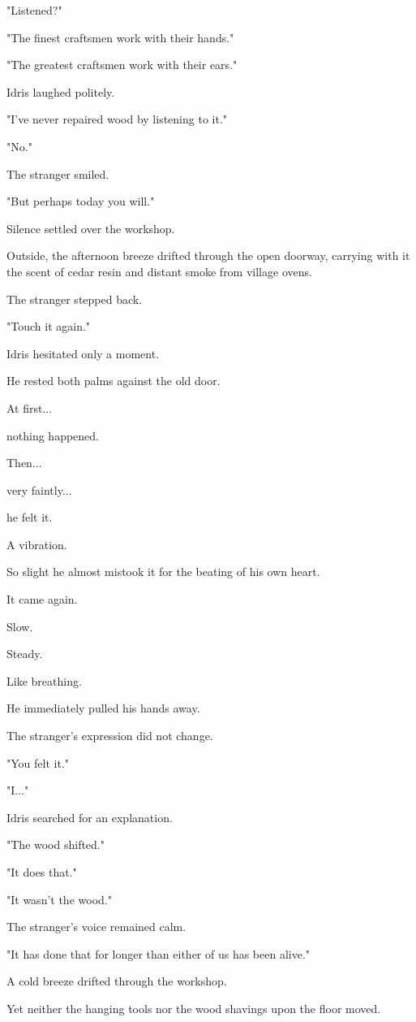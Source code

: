 \documentclass[12pt,openany]{book}
\begin{document}
"Listened?"

"The finest craftsmen work with their hands."

"The greatest craftsmen work with their ears."

Idris laughed politely.

"I've never repaired wood by listening to it."

"No."

The stranger smiled.

"But perhaps today you will."

Silence settled over the workshop.

Outside, the afternoon breeze drifted through the open doorway, carrying with it the scent of cedar resin and distant smoke from village ovens.

The stranger stepped back.

"Touch it again."

Idris hesitated only a moment.

He rested both palms against the old door.

At first...

nothing happened.

Then...

very faintly...

he felt it.

A vibration.

So slight he almost mistook it for the beating of his own heart.

It came again.

Slow.

Steady.

Like breathing.

He immediately pulled his hands away.

The stranger's expression did not change.

"You felt it."

"I..."

Idris searched for an explanation.

"The wood shifted."

"It does that."

"It wasn't the wood."

The stranger's voice remained calm.

"It has done that for longer than either of us has been alive."

A cold breeze drifted through the workshop.

Yet neither the hanging tools nor the wood shavings upon the floor moved.
\end{document}
